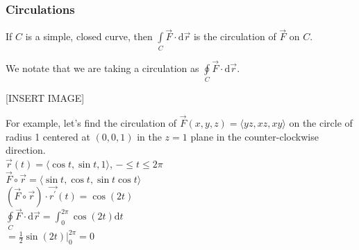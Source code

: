 \subsubsection{Circulations}
\begin{definition}
	If $C$ is a simple, closed curve, then $\int\limits_{C}{\vec{F}\cdot\mathrm{d}\vec{r}}$ is the circulation of $\vec{F}$ on $C$.
\end{definition}
\noindent
We notate that we are taking a circulation as $\oint\limits_{C}{\vec{F}\cdot\mathrm{d}\vec{r}}$.

[INSERT IMAGE]

\noindent
For example, let's find the circulation of $\vec{F}(x,y,z)=\langle yz, xz, xy \rangle$ on the circle of radius 1 centered at $(0,0,1)$ in the $z=1$ plane in the counter-clockwise direction.\\
\indent
$\vec{r}(t)=\langle \cos{t},\sin{t},1\rangle$, $-\leq t\leq 2\pi$\\
\indent
$\vec{F}\circ\vec{r}=\langle \sin{t},\cos{t},\sin{t}\cos{t}\rangle$\\
\indent
$\left(\vec{F}\circ\vec{r}\right)\cdot\vec{r^\prime}(t)=\cos{(2t)}$\\
\indent
$\oint\limits_{C}{\vec{F}\cdot\mathrm{d}\vec{r}}=\int_{0}^{2\pi}{\cos{(2t)}\mathrm{d}t}$\\
\indent
$=\frac{1}{2}\sin{(2t)}\rvert_{0}^{2\pi}=0$\\